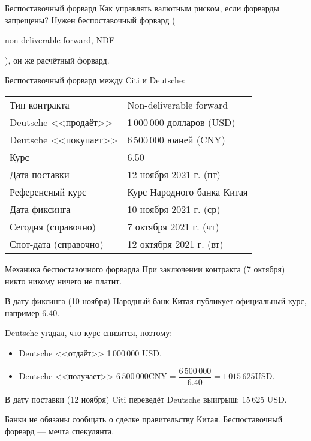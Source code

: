 \documentclass{beamer}
\newcommand{\en}[1]{\begin{otherlanguage}{english}#1\end{otherlanguage}}
\begin{document}
\begin{frame}{Беспоставочный форвард}
\justify
Как управлять валютным риском, если форварды запрещены? Нужен \alert{беспоставочный форвард} (\en{non-deliverable forward, NDF}), он же расчётный форвард.

\justify
Беспоставочный форвард между Citi и Deutsche:

\justify
\centering
\begin{tabular}{l|l}
	Тип контракта 		   & Non-deliverable forward		\\
	Deutsche <<продаёт>>  & 1\,000\,000 долларов (USD)	\\
	Deutsche <<покупает>> & 6\,500\,000 юаней (CNY)		\\
	Курс		 		      & 6.50 						\\
	Дата поставки		   & 12 ноября 2021 г. (пт) \\
	Референсный курс	   & Курс Народного банка Китая	\\
	Дата фиксинга		   & 10 ноября 2021 г. (ср) \\
	Сегодня (справочно)	& 7 октября 2021 г. (чт) \\
	Спот-дата (справочно) & 12 октября 2021 г. (вт)
\end{tabular}
\end{frame}



\begin{frame}{Механика беспоставочного форварда}
\justify
При заключении контракта (7 октября) никто никому ничего не платит.

\justify
В дату фиксинга (10 ноября) Народный банк Китая публикует официальный курс, например 6.40.

\justify
Deutsche угадал, что курс снизится, поэтому:
\begin{itemize}
\justifying
\item Deutsche <<отдаёт>> 1\,000\,000 USD.
\item Deutsche <<получает>> $6\,500\,000 \text{CNY} = \dfrac{6\,500\,000}{6.40} = 1\,015\,625 \text{USD}$.
\end{itemize}

\justify
В дату поставки (12 ноября) Citi переведёт Deutsche выигрыш: 15\,625 USD.

\justify Банки не обязаны сообщать о сделке правительству Китая. Беспоставочный форвард --- мечта спекулянта.
\end{frame}
\end{document}
